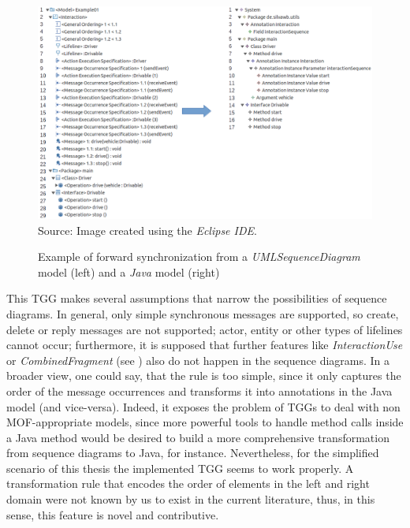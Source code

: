 \documentclass[tuberlin,cic,tc,english,noabntcite,oneside]{iiufrgs}
\begin{document}
\begin{figure}[h]
	\centering
    \caption{Example of forward synchronization from a \emph{UMLSequenceDiagram} model (left) and a \emph{Java} model (right)}
    \includegraphics[width=\textwidth]{umlSequenceDiagram2java_Example01} \\
    Source: Image created using the \emph{Eclipse IDE}.
    \label{fig:umlSequenceDiagram2java_Example01}
\end{figure}

This TGG makes several assumptions that narrow the possibilities of sequence diagrams. In general, only simple synchronous messages are supported, so create, delete or reply messages are not supported; actor, entity or other types of lifelines cannot occur; furthermore, it is supposed that further features like \emph{InteractionUse} or \emph{CombinedFragment} (see \citealp[p. 621 and p. 630]{omg2015meta}) also do not happen in the sequence diagrams. In a broader view, one could say, that the rule is too simple, since it only captures the order of the message occurrences and transforms it into annotations in the Java model (and vice-versa). Indeed, it exposes the problem of TGGs to deal with non MOF-appropriate models, since more powerful tools to handle method calls inside a Java method would be desired to build a more comprehensive transformation from sequence diagrams to Java, for instance. Nevertheless, for the simplified scenario of this thesis the implemented TGG seems to work properly. A transformation rule that encodes the order of elements in the left and right domain were not known by us to exist in the current literature, thus, in this sense, this feature is novel and contributive.
\end{document}
